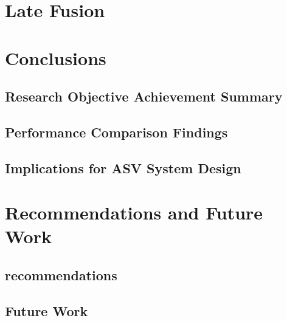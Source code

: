 \documentclass{erauthesis}
\begin{document}
\chapter{Late Fusion} \label{late_fusion}

\chapter{Conclusions} 


\section{Research Objective Achievement Summary}

\section{Performance Comparison Findings}

\section{Implications for ASV System Design}

\chapter{Recommendations and Future Work} 

\section{recommendations} \label{reccomendations}

\section{Future Work} \label{futurework}
\end{document}
